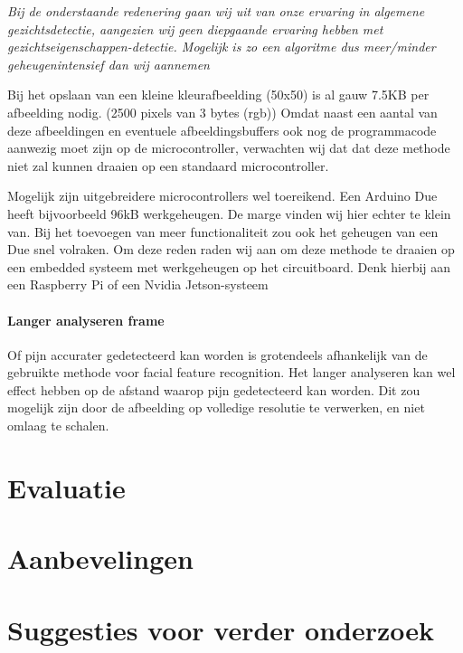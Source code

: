 \documentclass[11pt]{article}
\begin{document}
    \emph{Bij de onderstaande redenering gaan wij uit van onze ervaring in algemene gezichtsdetectie, aangezien wij geen diepgaande ervaring hebben met gezichtseigenschappen-detectie.
    Mogelijk is zo een algoritme dus meer/minder geheugenintensief dan wij aannemen}

    Bij het opslaan van een kleine kleurafbeelding (50x50) is al gauw 7.5KB per afbeelding nodig. (2500 pixels van 3 bytes (rgb))
    Omdat naast een aantal van deze afbeeldingen en eventuele afbeeldingsbuffers ook nog de programmacode aanwezig moet zijn op de microcontroller,
    verwachten wij dat dat deze methode niet zal kunnen draaien op een standaard microcontroller.

    
    Mogelijk zijn uitgebreidere microcontrollers wel toereikend.
    Een Arduino Due heeft bijvoorbeeld 96kB werkgeheugen.
    De marge vinden wij hier echter te klein van.
    Bij het toevoegen van meer functionaliteit zou ook het geheugen van een Due snel volraken.
    Om deze reden raden wij aan om deze methode te draaien op een embedded systeem met werkgeheugen op het circuitboard.
    Denk hierbij aan een Raspberry Pi of een Nvidia Jetson-systeem

    \paragraph{Langer analyseren frame}
    Of pijn accurater gedetecteerd kan worden is grotendeels afhankelijk van de gebruikte methode voor facial feature recognition.
    Het langer analyseren kan wel effect hebben op de afstand waarop pijn gedetecteerd kan worden.
    Dit zou mogelijk zijn door de afbeelding op volledige resolutie te verwerken, en niet omlaag te schalen.




    \section{Evaluatie}\label{sec:evaluatie}


    \section{Aanbevelingen}\label{sec:aanbevelingen}


    \section{Suggesties voor verder onderzoek}\label{sec:suggesties-voor-verder-onderzoek}
\end{document}
